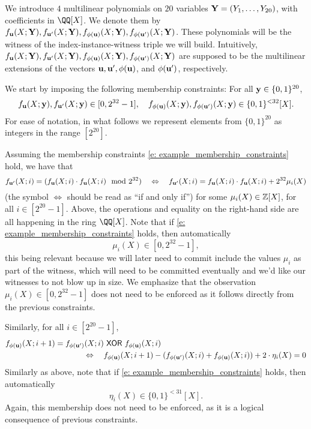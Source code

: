 \documentclass[11pt,letterpaper,usenames,dvipsnames]{article}
\newcommand{\albert}[1]{\textcolor{teal}{Albert: {#1}}}
\newcommand{\alberturgent}[1]{\textcolor{red}{Albert: {#1}}}
\begin{document}
We introduce $4$ multilinear polynomials on $20$ variables $\mathbf{Y}=(Y_1,\ldots, Y_{20})$, with coefficients in $\QQ[X]$. We denote them by $f_{\mathbf{u}}(X; \mathbf{Y}), f_{\mathbf{u}'}(X;\mathbf{Y}), f_{\phi(\mathbf{u})}(X;\mathbf{Y}), f_{\phi(\mathbf{u}')}(X;\mathbf{Y})$. These polynomials will be the witness of the index-instance-witness triple we will build. Intuitively, $f_{\mathbf{u}}(X; \mathbf{Y}), f_{\mathbf{u}'}(X;\mathbf{Y}), f_{\phi(\mathbf{u})}(X;\mathbf{Y}), f_{\phi(\mathbf{u}')}(X;\mathbf{Y})$ are supposed to be the multilinear extensions of the vectors $\mathbf{u}, \mathbf{u}', \phi(\mathbf{u})$, and $\phi(\mathbf{u}')$, respectively. 

We start by imposing the following membership constraints: For all $\mathbf{y}\in \{0,1\}^{20}$,
%
\begin{equation}\label{e: example_membership_constraints}
f_{\mathbf{u}}(X;\mathbf{y}), f_{\mathbf{u}'}(X;\mathbf{y}) \in [0,2^{32}-1], \quad f_{\phi(\mathbf{u})}(X;\mathbf{y}), f_{\phi(\mathbf{u}')}(X;\mathbf{y}) \in \{0,1\}^{<32}[X].
\end{equation}
%
For ease of notation, in what follows we represent elements from $\{0,1\}^{20}$ as integers in the range $[2^{20}]$. 

Assuming the membership constraints \eqref{e: example_membership_constraints} hold, we have that  
%
$$
f_{\mathbf{u}'}(X; i)= (f_{\mathbf{u}}(X;i)\cdot f_{\mathbf{u}}(X;i) \mod 2^{32}) \quad \Leftrightarrow  \quad f_{\mathbf{u}'}(X; i)= f_{\mathbf{u}}(X;i)\cdot f_{\mathbf{u}}(X;i) + 2^{32} \mu_i(X)
$$
(the symbol $\Leftrightarrow$ should be read as ``if and only if'')
for some $\mu_i(X)\in \mathbb{Z}[X]$, for all $i \in [2^{20}-1]$. Above, the operations and equality on the right-hand side  are all happening in the ring $\QQ[X]$.   Note that if \eqref{e: example_membership_constraints} holds, then automatically $$\mu_i(X) \in [0, 2^{32}-1],$$
this being relevant because we will later need to commit include the values $\mu_i$ as part of the witness, which will need to be committed eventually and we'd like our witnesses to not blow up in size. We emphasize that the observation $\mu_i(X) \in [0, 2^{32}-1]$  does not need to be enforced as it follows  directly from the previous constraints.


Similarly, for all $i\in [2^{20}-1]$,
%
\begin{align*}
&f_{\phi(\mathbf{u})}(X; i+1)= f_{\phi(\mathbf{u}')}(X;i)\ \mathsf{XOR}\  f_{\phi(\mathbf{u})}(X;i)\\ &\quad \quad \quad \quad \quad \quad \quad \quad \quad \quad \Leftrightarrow \quad  f_{\phi(\mathbf{u})}(X; i+1) - (f_{\phi(\mathbf{u}')}(X;i) + f_{\phi(\mathbf{u})}(X;i)) + 2\cdot \eta_i(X) =0
\end{align*}
Similarly as above, note that if \eqref{e: example_membership_constraints} holds, then automatically $$\eta_i(X) \in \{0,1\}^{<31}[X].$$  Again, this membership does not need to be enforced, as it is a logical consequence of previous constraints.
\end{document}
